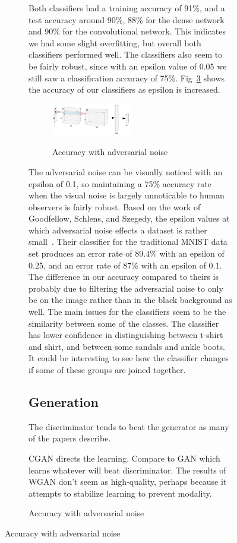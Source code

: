 \documentclass[conference]{IEEEtran}
\begin{document}
\begin{figure}[!h]
\begin{figure}[!h]
    Both classifiers had a training accuracy of 91\%, and a test accuracy around 90\%, 88\% for the dense network and 90\% for the convolutional network. This indicates we had some slight overfitting, but overall both classifiers performed well. The classifiers also seem to be fairly robust, since with an epsilon value of 0.05 we still saw a classification accuracy of 75\%. Fig~\ref{AdvPlot} shows the accuracy of our classifiers as epsilon is increased.
    \begin{figure}[!h]
    \begin{center}
    \caption{Accuracy with adversarial noise}
    \includegraphics[width=0.5\textwidth]{Second_Classifier_Architecture.png}
    \label{AdvPlot}
    \end{center}
    \end{figure}
The adversarial noise can be visually noticed with an epsilon of 0.1, so maintaining a 75\% accuracy rate when the visual noise is largely unnoticable to human observers is fairly robust. Based on the work of Goodfellow, Schlens, and Szegedy, the epsilon values at which adversarial noise effects a dataset is rather small~\cite{adversarialexamples}. Their classifier for the traditional MNIST data set produces an error rate of 89.4\% with an epsilon of 0.25, and an error rate of 87\% with an epsilon of 0.1. The difference in our accuracy compared to theirs is probably due to filtering the adversarial noise to only be on the image rather than in the black background as well. The main issues for the classifiers seem to be the similarity between some of the classes. The classifier has lower confidence in distinguishing between t-shirt and shirt, and between some sandals and ankle boots. It could be interesting to see how the classifier changes if some of these groups are joined together.

    \subsection{Generation}\label{subsec:results-generation}

    The discriminator tends to beat the generator as many of the papers describe.

    CGAN directs the learning. Compare to GAN which learns whatever will beat discriminator. The results of WGAN don't seem as high-quality, perhaps because it attempts to stabilize learning to prevent modality.


\end{figure}
\end{figure}
\end{document}
